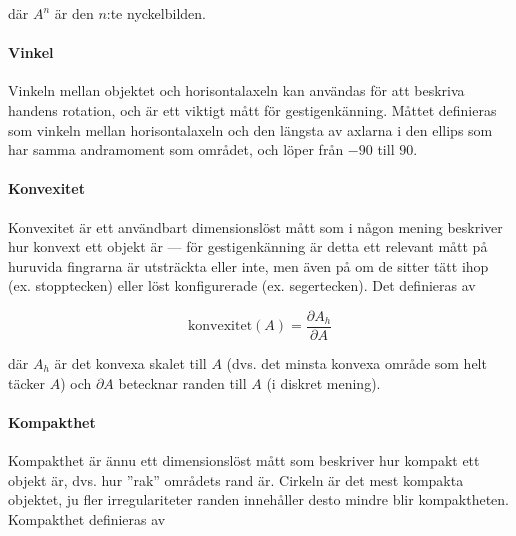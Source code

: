 \documentclass[../rapport_MVEX01-11-05]{subfiles}
\begin{document}

där $A^n$ är den $n$:te nyckelbilden.

\paragraph{Vinkel}
\label{feat:vinkel}

Vinkeln mellan objektet och horisontalaxeln kan användas för att
beskriva handens rotation, och är ett viktigt mått för
gestigenkänning. Måttet definieras som vinkeln mellan horisontalaxeln
och den längsta av axlarna i den ellips som har samma andramoment som
området, och löper från $-90$\textdegree{} till $90$\textdegree{}.




\paragraph{Konvexitet}

Konvexitet \cite[s.~26]{Rudemo09} är ett användbart dimensionslöst
mått som i någon mening beskriver hur konvext ett objekt är --- för
gestigenkänning är detta ett relevant mått på huruvida fingrarna är
utsträckta eller inte, men även på om de sitter tätt ihop (ex.
stopptecken) eller löst konfigurerade (ex. segertecken). Det
definieras av

\begin{equation*}
  \textrm{konvexitet}(A) = \frac{\partial A_h}{\partial A}
\end{equation*}

där $A_h$ är det konvexa skalet till $A$ (dvs. det minsta konvexa område som
helt täcker $A$) och $\partial A$ betecknar randen till $A$ (i diskret
mening).

\paragraph{Kompakthet}

Kompakthet \cite[s.~26]{Rudemo09} är ännu ett dimensionslöst mått som
beskriver hur kompakt ett objekt är, dvs. hur ''rak'' områdets rand
är. Cirkeln är det mest kompakta objektet, ju fler irregulariteter
randen innehåller desto mindre blir kompaktheten. Kompakthet
definieras av
\end{document}
